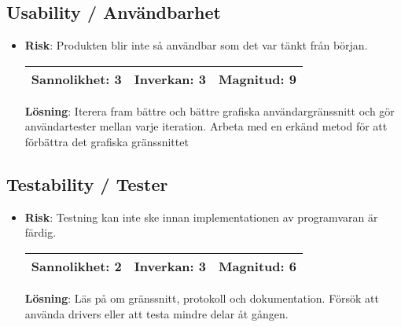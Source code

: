 \subsection{Usability / Användbarhet}
\begin{itemize}
\item \textbf{Risk}: Produkten blir inte så användbar som det var tänkt från början.

\begin{tabular}{ | l | l | l |}
	\hline
	Sannolikhet: 3 & Inverkan: 3 & Magnitud: 9 \\ \hline
\end{tabular}

\textbf{Lösning}: Iterera fram bättre och bättre grafiska användargränssnitt och gör användartester mellan varje iteration. Arbeta med en erkänd metod för att förbättra det grafiska gränssnittet
\end{itemize}

\subsection{Testability / Tester}
\begin{itemize}
\item \textbf{Risk}: Testning kan inte ske innan implementationen av programvaran är färdig.

\begin{tabular}{ | l | l | l |}
	\hline
	Sannolikhet: 2 & Inverkan: 3 & Magnitud: 6 \\ \hline
\end{tabular}

\textbf{Lösning}: Läs på om gränssnitt, protokoll och dokumentation. Försök att använda drivers eller att testa mindre delar åt gången.
\end{itemize}

